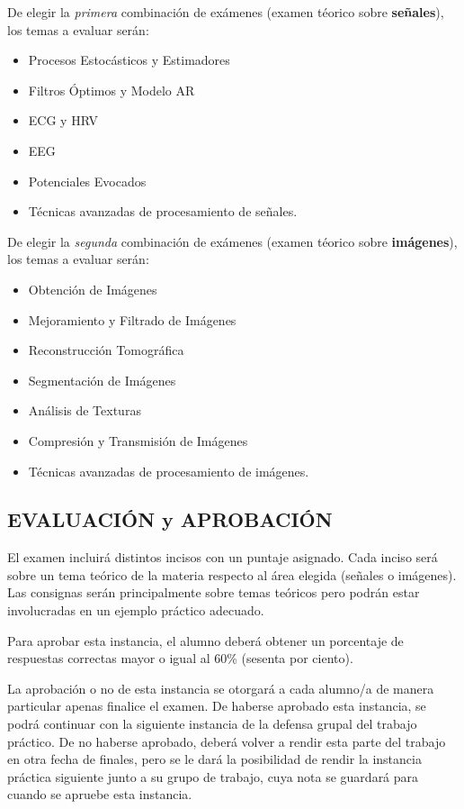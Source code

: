 \documentclass[10pt]{article}
\begin{document}
De elegir la \textit{primera} combinación de exámenes (examen téorico sobre \textbf{señales}), los temas a evaluar serán:
\begin{itemize}
    \item Procesos Estocásticos y Estimadores
    \item Filtros Óptimos y Modelo AR
    \item ECG y HRV
    \item EEG
    \item Potenciales Evocados
    \item Técnicas avanzadas de procesamiento de señales.
\end{itemize}
\vspace{0.35cm}

De elegir la \textit{segunda} combinación de exámenes (examen téorico sobre \textbf{imágenes}), los temas a evaluar serán:
\begin{itemize}
    \item Obtención de Imágenes
    \item Mejoramiento y Filtrado de Imágenes
    \item Reconstrucción Tomográfica
    \item Segmentación de Imágenes
    \item Análisis de Texturas
    \item Compresión y Transmisión de Imágenes
    \item Técnicas avanzadas de procesamiento de imágenes.
\end{itemize}
\vspace{0.25cm}

\subsection*{EVALUACIÓN y APROBACIÓN}

El examen incluirá distintos incisos con un puntaje asignado. Cada inciso será sobre un tema teórico de la materia respecto al área elegida (señales o imágenes). Las consignas serán principalmente sobre temas teóricos pero podrán estar involucradas en un ejemplo práctico adecuado.
\vspace{0.25cm}

Para aprobar esta instancia, el alumno deberá obtener un porcentaje de respuestas correctas mayor o igual al 60\% (sesenta por ciento).
\vspace{0.25cm}

La aprobación o no de esta instancia se otorgará a cada alumno/a de manera particular apenas finalice el examen. De haberse aprobado esta instancia, se podrá continuar con la siguiente instancia de la defensa grupal del trabajo práctico. De no haberse aprobado, deberá volver a rendir esta parte del trabajo en otra fecha de finales, pero se le dará la posibilidad de rendir la instancia práctica siguiente junto a su grupo de trabajo, cuya nota se guardará para cuando se apruebe esta instancia.
\end{document}
